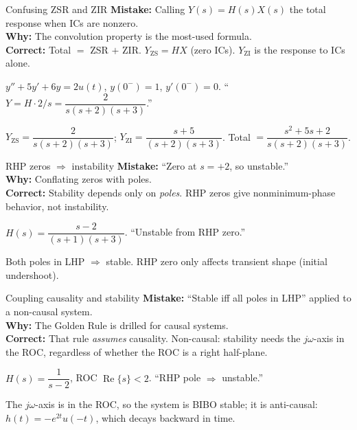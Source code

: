 \documentclass[11pt]{article}
\renewcommand{\Re}{\operatorname{Re}}
\begin{document}
\begin{pitfallbox}{Confusing ZSR and ZIR}
\textbf{Mistake:} Calling $Y(s) = H(s)X(s)$ the total response when ICs are nonzero.\\
\textbf{Why:} The convolution property is the most-used formula.\\
\textbf{Correct:} Total $=$ ZSR $+$ ZIR. $Y_{\text{ZS}} = HX$ (zero ICs). $Y_{\text{ZI}}$ is the response to ICs alone.
\begin{wrongbox}
$y'' + 5y' + 6y = 2u(t)$, $y(0^-)=1$, $y'(0^-)=0$. ``$Y = H\cdot 2/s = \dfrac{2}{s(s+2)(s+3)}$.''
\end{wrongbox}
\begin{rightbox}
$Y_{\text{ZS}} = \dfrac{2}{s(s+2)(s+3)}$; $Y_{\text{ZI}} = \dfrac{s+5}{(s+2)(s+3)}$. Total $= \dfrac{s^2 + 5s + 2}{s(s+2)(s+3)}$.
\end{rightbox}
\end{pitfallbox}

\begin{pitfallbox}{RHP zeros $\Rightarrow$ instability}
\textbf{Mistake:} ``Zero at $s=+2$, so unstable.''\\
\textbf{Why:} Conflating zeros with poles.\\
\textbf{Correct:} Stability depends only on \emph{poles}. RHP zeros give nonminimum-phase behavior, not instability.
\begin{wrongbox}
$H(s) = \dfrac{s-2}{(s+1)(s+3)}$. ``Unstable from RHP zero.''
\end{wrongbox}
\begin{rightbox}
Both poles in LHP $\Rightarrow$ stable. RHP zero only affects transient shape (initial undershoot).
\end{rightbox}
\end{pitfallbox}

\begin{pitfallbox}{Coupling causality and stability}
\textbf{Mistake:} ``Stable iff all poles in LHP'' applied to a non-causal system.\\
\textbf{Why:} The Golden Rule is drilled for causal systems.\\
\textbf{Correct:} That rule \emph{assumes} causality. Non-causal: stability needs the $j\omega$-axis in the ROC, regardless of whether the ROC is a right half-plane.
\begin{wrongbox}
$H(s) = \dfrac{1}{s-2}$, ROC $\Re\{s\}<2$. ``RHP pole $\Rightarrow$ unstable.''
\end{wrongbox}
\begin{rightbox}
The $j\omega$-axis is in the ROC, so the system is BIBO stable; it is anti-causal: $h(t) = -e^{2t}u(-t)$, which decays backward in time.
\end{rightbox}
\end{pitfallbox}
\end{document}
